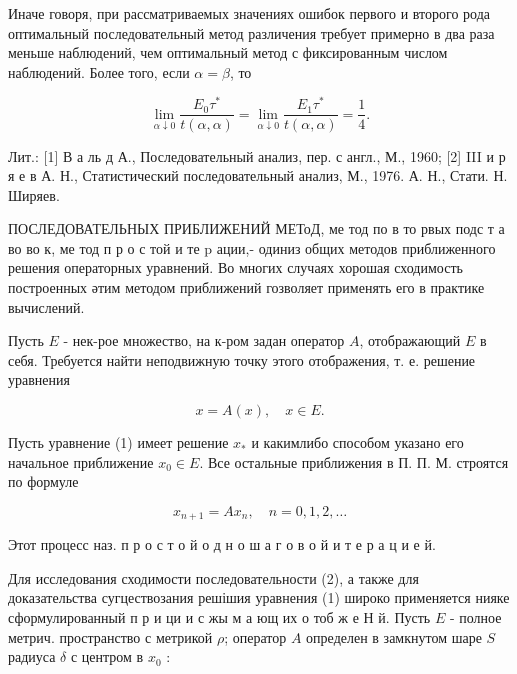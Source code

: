 \documentclass[10pt]{article}
\begin{document}
Иначе говоря, при рассматриваемых значениях ошибок первого и второго рода оптимальный последовательный метод различения требует примерно в два раза меньше наблюдений, чем оптимальный метод с фиксированным числом наблюдений. Более того, если $\alpha=\beta$, то



\[

\lim _{\alpha \downarrow 0} \frac{E_{0} \tau^{*}}{t(\alpha, \alpha)}=\lim _{\alpha \downarrow 0} \frac{E_{1} \tau^{*}}{t(\alpha, \alpha)}=\frac{1}{4} .

\]



Лит.: [1] В а ль д А., Последовательный анализ, пер. с англ., М., 1960; [2] III и р я е в А. Н., Статистический последовательный анализ, М., 1976. А. Н., Стати. Н. Ширяев.



ПОСЛЕДОВАТЕЛЬНЫХ ПРИБЛИЖЕНИЙ МЕТоД, ме тод по в то рвых подс т а во во к, ме тод п р о с той и те p ации,- одиниз общих методов приближенного решения операторных уравнений. Во многих случаях хорошая сходимость построенных әтим методом приближений гозволяет применять его в практике вычислений.



Пусть $E$ - нек-рое множество, на к-ром задан оператор $A$, отображающий $E$ в себя. Требуется найти неподвижную точку этого отображения, т. е. решение уравнения



\[

x=A(x), \quad x \in E .

\]



Пусть уравнение (1) имеет решение $x_{*}$ и какимлибо способом указано его начальное приближение $x_{0} \in E$. Все остальные приближения в П. П. М. строятся по формуле



\[

x_{n+1}=A x_{n}, \quad n=0,1,2, \ldots

\]



Этот процесс наз. п р о с т о й о д н о ш а г о в о й и т е р а ц и е й.



Для исследования сходимости последовательности (2), а также для доказательства сугцествозания решішия уравнения (1) широко применяется нияке сформулированный п р и ци и с жы м а ющ их о тоб ж $е$ Н й. Пусть $E$ - полное метрич. пространство с метрикой $\rho$; оператор $A$ определен в замкнутом шаре $S$ радиуса $\delta$ с центром в $x_{0}$ :
\end{document}
